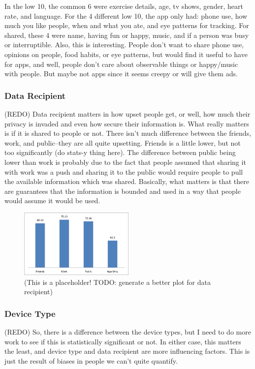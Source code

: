 \documentclass{acm_proc_article-sp}
\begin{document}
In the low 10, the common 6 were exercise details, age, tv shows, gender, heart rate, and language. For the 4 different low 10, the app only had: phone use, how much you like people, when and what you ate, and eye patterns for tracking. For shared, these 4 were name, having fun or happy, music, and if a person was busy or interruptible. Also, this is interesting. People don't want to share phone use, opinions on people, food habits, or eye patterns, but would find it useful to have for apps, and well, people don't care about observable things or happy/music with people. But maybe not apps since it seems creepy or will give them ads.

\subsubsection{Data Recipient}
(REDO) Data recipient matters in how upset people get, or well, how much their privacy is invaded and even how secure their information is. What really matters is if it is shared to people or not. There isn't much difference between the friends, work, and public--they are all quite upsetting. Friends is a little lower, but not too significantly (do stats-y thing here). The difference between public being lower than work is probably due to the fact that people assumed that sharing it with work was a push and sharing it to the public would require people to pull the available information which was shared. Basically, what matters is that there are guarantees that the information is bounded and used in a way that people would assume it would be used.

\begin{figure}
	\centering
	\includegraphics[width=0.5\textwidth]{recipient.png}
	\caption{(This is a placeholder! TODO: generate a better plot for data recipient)}
\end{figure}

\subsubsection{Device Type}
(REDO) So, there is a difference between the device types, but I need to do more work to see if this is statistically significant or not. In either case, this matters the least, and device type and data recipient are more influencing factors. This is just the result of biases in people we can't quite quantify.  
\end{document}
